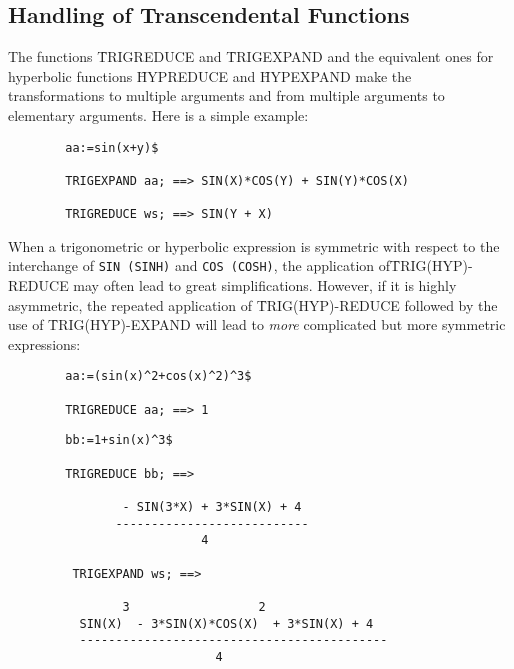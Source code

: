 \subsection{Handling of Transcendental Functions}
The functions \f{TRIGREDUCE} and \f{TRIGEXPAND} and the equivalent
ones for hyperbolic functions \f{HYPREDUCE} and \f{HYPEXPAND}
make the transformations to multiple arguments and from
multiple arguments to elementary arguments. Here is a simple example:
\begin{verbatim}
        aa:=sin(x+y)$

        TRIGEXPAND aa; ==> SIN(X)*COS(Y) + SIN(Y)*COS(X)

        TRIGREDUCE ws; ==> SIN(Y + X)
\end{verbatim}
When a trigonometric or hyperbolic expression is symmetric with
respect to the interchange of {\tt SIN (SINH)} and {\tt COS (COSH)},
the application of\linebreak \f{TRIG(HYP)-REDUCE} may often lead to great
simplifications. However, if it is highly asymmetric, the repeated
application of \f{TRIG(HYP)-REDUCE} followed by the use of
\f{TRIG(HYP)-EXPAND} will lead to \emph{more} complicated
but more symmetric expressions:
\begin{verbatim}
        aa:=(sin(x)^2+cos(x)^2)^3$

        TRIGREDUCE aa; ==> 1
\end{verbatim}
\begin{verbatim}
        bb:=1+sin(x)^3$

        TRIGREDUCE bb; ==>

                - SIN(3*X) + 3*SIN(X) + 4
               ---------------------------
                           4

         TRIGEXPAND ws; ==>

                3                  2
          SIN(X)  - 3*SIN(X)*COS(X)  + 3*SIN(X) + 4
          -------------------------------------------
                             4
\end{verbatim}
